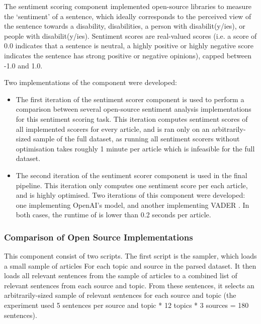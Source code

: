 \documentclass{report}
\newcommand{\textapprox}{\raisebox{0.5ex}{\texttildelow}}  %
\begin{document}
The sentiment scoring component implemented open-source libraries to measure the `sentiment' of a sentence, which ideally corresponds to the perceived view of the sentence towards a disability, disabilities, a person with disabilit(y/ies), or people with disabilit(y/ies).
Sentiment scores are real-valued scores (i.e. a score of 0.0 indicates that a sentence is neutral, a highly positive or highly negative score indicates the sentence has strong positive or negative opinions), capped between -1.0 and 1.0.

Two implementations of the component were developed: 
\begin{itemize}
	\item The first iteration of the sentiment scorer component is used to perform a comparison between several open-source sentiment analysis implementations for this sentiment scoring task.
		This iteration computes sentiment scores of all implemented scorers for every article, and is ran only on an arbitrarily-sized sample of the full dataset, as running all sentiment scorers without optimisation takes roughly \textapprox1 minute per article which is infeasible for the full dataset.
	\item The second iteration of the sentiment scorer component is used in the final pipeline.
		This iteration only computes one sentiment score per each article, and is highly optimised.
		Two iterations of this component were developed: one implementing OpenAI's \cite{OpenAI} model, and another implementing VADER \cite{VADER}.
		In both cases, the runtime of is lower than 0.2 seconds per article.
\end{itemize}

\subsubsection{Comparison of Open Source Implementations} \label{des-sentiment-comparison}

This component consist of two scripts.
The first script is the sampler, which loads a small sample of articles For each topic and source in the parsed dataset.
It then loads all relevant sentences from the sample of articles to a combined list of relevant sentences from each source and topic.
From these sentences, it selects an arbitrarily-sized sample of relevant sentences for each source and topic (the experiment used 5 sentences per source and topic * 12 topics * 3 sources = 180 sentences).
\end{document}
